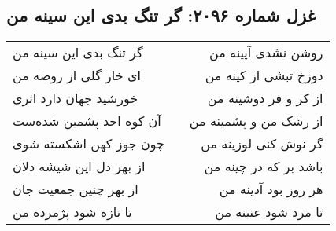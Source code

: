\begin{center}
\section*{غزل شماره ۲۰۹۶: گر تنگ بدی این سینه من}
\label{sec:2096}
\begin{longtable}{l p{0.5cm} r}
گر تنگ بدی این سینه من
&&
روشن نشدی آیینه من
\\
ای خار گلی از روضه من
&&
دوزخ تبشی از کینه من
\\
خورشید جهان دارد اثری
&&
از کر و فر دوشینه من
\\
آن کوه احد پشمین شده‌ست
&&
از رشک من و پشمینه من
\\
چون جوز کهن اشکسته شوی
&&
گر نوش کنی لوزینه من
\\
از بهر دل این شیشه دلان
&&
باشد بر که در چینه من
\\
از بهر چنین جمعیت جان
&&
هر روز بود آدینه من
\\
تا تازه شود پژمرده من
&&
تا مرد شود عنینه من
\\
\end{longtable}
\end{center}
